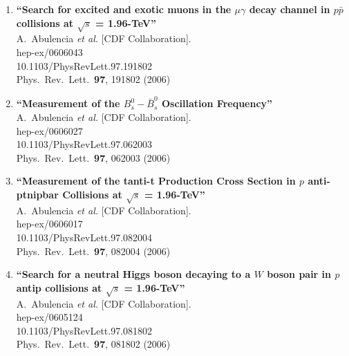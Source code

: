 \documentclass{article}
\begin{document}
\begin{enumerate}
\item%
{\bf ``Search for excited and exotic muons in the $\mu \gamma$ decay channel in $p \bar{p}$ collisions at $\sqrt{s}$ = 1.96-TeV''}
  \\{}A.~Abulencia {\it et al.}  [CDF Collaboration].
  \\{}hep-ex/0606043
    \\{}10.1103/PhysRevLett.97.191802
\\{}Phys.\ Rev.\ Lett.\  {\bf 97}, 191802 (2006) %


\item%
{\bf ``Measurement of the $B^0_{s}-\bar{B}^0_s$ Oscillation Frequency''}
  \\{}A.~Abulencia {\it et al.}  [CDF Collaboration].
  \\{}hep-ex/0606027
    \\{}10.1103/PhysRevLett.97.062003
\\{}Phys.\ Rev.\ Lett.\  {\bf 97}, 062003 (2006) %


\item%
{\bf ``Measurement of the tanti-t Production Cross Section in $p$ anti-ptnipbar Collisions at $\sqrt{s}$ = 1.96-TeV''}
  \\{}A.~Abulencia {\it et al.}  [CDF Collaboration].
  \\{}hep-ex/0606017
    \\{}10.1103/PhysRevLett.97.082004
\\{}Phys.\ Rev.\ Lett.\  {\bf 97}, 082004 (2006) %


\item%
{\bf ``Search for a neutral Higgs boson decaying to a $W$ boson pair in $p$ antip collisions at $\sqrt{s}$ = 1.96-TeV''}
  \\{}A.~Abulencia {\it et al.}  [CDF Collaboration].
  \\{}hep-ex/0605124
    \\{}10.1103/PhysRevLett.97.081802
\\{}Phys.\ Rev.\ Lett.\  {\bf 97}, 081802 (2006) %



\end{enumerate}
\end{document}
